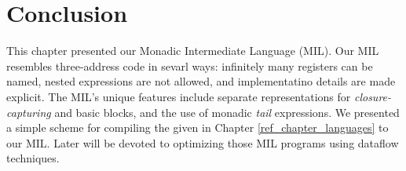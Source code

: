 \documentclass[12pt]{report}
\begin{document}
\section{Conclusion}

This chapter presented our Monadic Intermediate Language (MIL). Our
MIL resembles three-address code in sevarl ways: infinitely many
registers can be named, nested expressions are not allowed, and
implementatino details are made explicit. The MIL's unique features
include separate representations for \emph{closure-capturing} and
basic blocks, and the use of monadic \emph{tail} expressions. We 
presented a simple scheme for compiling the \lamA given in
Chapter \ref{ref_chapter_languages} to our MIL. Later will be devoted
to optimizing those MIL programs using dataflow techniques.







\end{document}
